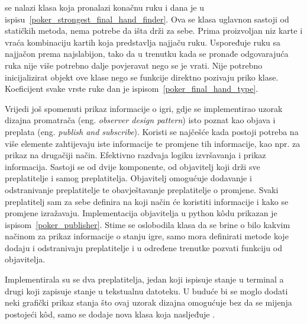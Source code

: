 se nalazi klasa koja pronalazi konačnu ruku i dana je u ispisu~\ref{poker_strongest_final_hand_finder}. Ova se klasa uglavnon sastoji od statičkih metoda, nema potrebe da išta drži za sebe. Prima proizvoljan niz karte i vraća kombinaciju kartih koja predstavlja najjaču ruku. Uspoređuje ruku sa najjačon prema najslabijon, tako da u trenutku kada se pronađe odgovarajuća ruka nije više potrebno dalje povjeravat nego se je vrati. Nije potrebno inicijalizirat objekt ove klase nego se funkcije direktno pozivaju priko klase. Koeficijent svake vrste ruke dan je ispisom~\ref{poker_final_hand_type}.


Vrijedi još spomenuti prikaz informacije o igri, gdje se implementirao uzorak dizajna promatrača (eng. \textit{observer design pattern}) isto poznat kao objava i preplata (eng. \textit{publish and subscribe}). Koristi se najčešće kada postoji potreba na više elemente zahtijevaju iste informacije te promjene tih informacije, kao npr. za prikaz na drugačiji način. Efektivno razdvaja logiku izvršavanja i prikaz informacija. Sastoji se od dvije komponente, od objavitelj koji drži sve preplatitelje i samog preplatitelja. Objavitelj omogućuje dodavanje i odstranivanje preplatitelje te obavještavanje preplatitelje o promjene. Svaki preplatitelj sam za sebe definira na koji način će koristiti informacije i kako se promjene izražavaju. Implementacija objavitelja u python k\^odu prikazan je ispisom~\ref{poker_publisher}. Stime se oslobodila klasa  da se brine o bilo kakvim načinom za prikaz informacije o stanju igre, samo mora definirati metode koje dodaju i odstranivaju preplatitelje i u određene trenutke pozvati  funkciju od objavitelja.


Implementirala su se dva preplatitelja, jedan koji ispisuje stanje u terminal a drugi koji zapisuje stanje u tekstualnu datoteku. U buduće bi se moglo dodati neki grafički prikaz stanja što ovaj uzorak dizajna omogućuje bez da se mijenja postojeći k\^od, samo se dodaje nova klasa koja nasljeđuje .

